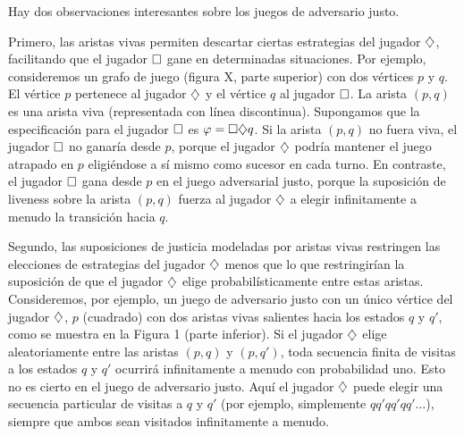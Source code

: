 Hay dos observaciones interesantes sobre los juegos de adversario justo.

Primero, las aristas vivas permiten descartar ciertas estrategias del jugador
$\diamondsuit$, facilitando que el jugador $\square$ gane en determinadas situaciones.
Por ejemplo, consideremos un grafo de juego (figura X, parte superior) con dos
vértices $p$ y $q$. El vértice $p$ pertenece al jugador $\diamondsuit$ y el vértice
$q$ al jugador $\square$. La arista $(p, q)$ es una arista viva (representada con
línea discontinua). Supongamos que la especificación para el jugador $\square$ es
$\varphi = \square \diamondsuit q$. Si la arista $(p, q)$ no fuera viva, el jugador
$\square$ no ganaría desde $p$, porque el jugador $\diamondsuit$ podría mantener el
juego atrapado en $p$ eligiéndose a sí mismo como sucesor en cada turno. En
contraste, el jugador $\square$ gana desde $p$ en el juego adversarial justo,
porque la suposición de liveness sobre la arista $(p, q)$ fuerza al jugador
$\diamondsuit$ a elegir infinitamente a menudo la transición hacia $q$.

Segundo, las suposiciones de justicia modeladas por aristas vivas restringen
las elecciones de estrategias del jugador $\diamondsuit$ menos que lo que
restringirían la suposición de que el jugador $\diamondsuit$ elige probabilísticamente
entre estas aristas. Consideremos, por ejemplo, un juego de adversario justo
con un único vértice del jugador $\diamondsuit$, $p$ (cuadrado) con dos aristas vivas
salientes hacia los estados $q$ y $q'$, como se muestra en la Figura 1 (parte
inferior). Si el jugador $\diamondsuit$ elige aleatoriamente entre las aristas $(p,
	q)$ y $(p, q')$, toda secuencia finita de visitas a los estados $q$ y $q'$
ocurrirá infinitamente a menudo con probabilidad uno. Esto no es cierto en el
juego de adversario justo. Aquí el jugador $\diamondsuit$ puede elegir una secuencia
particular de visitas a $q$ y $q'$ (por ejemplo, simplemente $qq'qq'qq'\dots$),
siempre que ambos sean visitados infinitamente a menudo.

